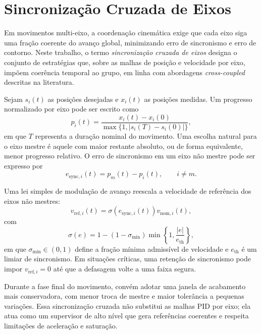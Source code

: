 \section{Sincroniza\c{c}\~ao Cruzada de Eixos}
\label{sec:sync_cross}

Em movimentos multi-eixo, a coordena\c{c}\~ao cinem\'atica exige que cada
eixo siga uma fra\c{c}\~ao coerente do avan\c{c}o global, minimizando erro
de sincronismo e erro de contorno. Neste trabalho, o termo
\emph{sincroniza\c{c}\~ao cruzada de eixos} designa o conjunto de
estrat\'egias que, sobre as malhas de posi\c{c}\~ao e velocidade por eixo,
imp\~oem coer\^encia temporal ao grupo, em linha com abordagens
\emph{cross-coupled} descritas na literatura.

Sejam $s_i(t)$ as posi\c{c}\~oes desejadas e $x_i(t)$ as posi\c{c}\~oes
medidas. Um progresso normalizado por eixo pode ser escrito como
\begin{equation}
    p_i(t) =
    \frac{x_i(t) - x_i(0)}
         {\max\{1, |s_i(T) - s_i(0)|\}},
\end{equation}
em que $T$ representa a dura\c{c}\~ao nominal do movimento. Uma escolha
natural para o eixo mestre \'e aquele com maior restante absoluto, ou de
forma equivalente, menor progresso relativo. O erro de sincronismo em um
eixo n\~ao mestre pode ser expresso por
\begin{equation}
    e_{\text{sync},i}(t) = p_m(t) - p_i(t), \qquad i \neq m.
\end{equation}

Uma lei simples de modula\c{c}\~ao de avan\c{c}o reescala a velocidade de
refer\^encia dos eixos n\~ao mestres:
\begin{equation}
    v_{\text{ref},i}(t) =
    \sigma\!\left(e_{\text{sync},i}(t)\right) v_{\text{nom},i}(t),
\end{equation}
com
\begin{equation}
    \sigma(e)
    =
    1 - (1 - \sigma_{\min})
    \min\left\{1, \frac{|e|}{e_{\text{th}}}\right\},
\end{equation}
em que $\sigma_{\min}\in(0,1)$ define a fra\c{c}\~ao m\'inima admiss\'ivel
de velocidade e $e_{\text{th}}$ \'e um limiar de sincronismo. Em situa\c{c}\~oes
cr\'iticas, uma reten\c{c}\~ao de sincronismo pode impor
$v_{\text{ref},i}=0$ at\'e que a defasagem volte a uma faixa segura.

Durante a fase final do movimento, conv\'em adotar uma janela de
acabamento mais conservadora, com menor troca de mestre e maior toler\^ancia
a pequenas varia\c{c}\~oes. Essa sincroniza\c{c}\~ao cruzada n\~ao substitui
as malhas PID por eixo; ela atua como um supervisor de alto n\'ivel que
gera refer\^encias coerentes e respeita limita\c{c}\~oes de acelera\c{c}\~ao e
satura\c{c}\~ao.

